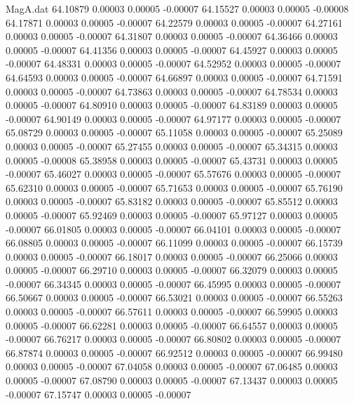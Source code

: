 \begin{filecontents}{MagA.dat}
  64.10879    0.00003    0.00005   -0.00007
  64.15527    0.00003    0.00005   -0.00008
  64.17871    0.00003    0.00005   -0.00007
  64.22579    0.00003    0.00005   -0.00007
  64.27161    0.00003    0.00005   -0.00007
  64.31807    0.00003    0.00005   -0.00007
  64.36466    0.00003    0.00005   -0.00007
  64.41356    0.00003    0.00005   -0.00007
  64.45927    0.00003    0.00005   -0.00007
  64.48331    0.00003    0.00005   -0.00007
  64.52952    0.00003    0.00005   -0.00007
  64.64593    0.00003    0.00005   -0.00007
  64.66897    0.00003    0.00005   -0.00007
  64.71591    0.00003    0.00005   -0.00007
  64.73863    0.00003    0.00005   -0.00007
  64.78534    0.00003    0.00005   -0.00007
  64.80910    0.00003    0.00005   -0.00007
  64.83189    0.00003    0.00005   -0.00007
  64.90149    0.00003    0.00005   -0.00007
  64.97177    0.00003    0.00005   -0.00007
  65.08729    0.00003    0.00005   -0.00007
  65.11058    0.00003    0.00005   -0.00007
  65.25089    0.00003    0.00005   -0.00007
  65.27455    0.00003    0.00005   -0.00007
  65.34315    0.00003    0.00005   -0.00008
  65.38958    0.00003    0.00005   -0.00007
  65.43731    0.00003    0.00005   -0.00007
  65.46027    0.00003    0.00005   -0.00007
  65.57676    0.00003    0.00005   -0.00007
  65.62310    0.00003    0.00005   -0.00007
  65.71653    0.00003    0.00005   -0.00007
  65.76190    0.00003    0.00005   -0.00007
  65.83182    0.00003    0.00005   -0.00007
  65.85512    0.00003    0.00005   -0.00007
  65.92469    0.00003    0.00005   -0.00007
  65.97127    0.00003    0.00005   -0.00007
  66.01805    0.00003    0.00005   -0.00007
  66.04101    0.00003    0.00005   -0.00007
  66.08805    0.00003    0.00005   -0.00007
  66.11099    0.00003    0.00005   -0.00007
  66.15739    0.00003    0.00005   -0.00007
  66.18017    0.00003    0.00005   -0.00007
  66.25066    0.00003    0.00005   -0.00007
  66.29710    0.00003    0.00005   -0.00007
  66.32079    0.00003    0.00005   -0.00007
  66.34345    0.00003    0.00005   -0.00007
  66.45995    0.00003    0.00005   -0.00007
  66.50667    0.00003    0.00005   -0.00007
  66.53021    0.00003    0.00005   -0.00007
  66.55263    0.00003    0.00005   -0.00007
  66.57611    0.00003    0.00005   -0.00007
  66.59905    0.00003    0.00005   -0.00007
  66.62281    0.00003    0.00005   -0.00007
  66.64557    0.00003    0.00005   -0.00007
  66.76217    0.00003    0.00005   -0.00007
  66.80802    0.00003    0.00005   -0.00007
  66.87874    0.00003    0.00005   -0.00007
  66.92512    0.00003    0.00005   -0.00007
  66.99480    0.00003    0.00005   -0.00007
  67.04058    0.00003    0.00005   -0.00007
  67.06485    0.00003    0.00005   -0.00007
  67.08790    0.00003    0.00005   -0.00007
  67.13437    0.00003    0.00005   -0.00007
  67.15747    0.00003    0.00005   -0.00007
\end{filecontents}
